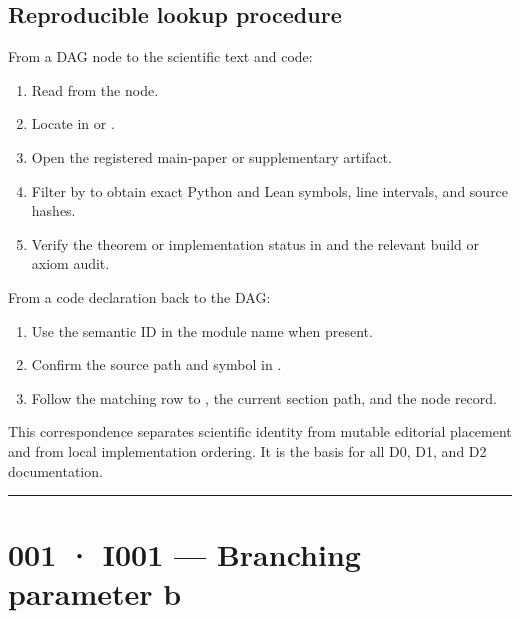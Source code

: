 \subsection{Reproducible lookup
procedure}\label{reproducible-lookup-procedure}

From a DAG node to the scientific text and code:

\begin{enumerate}
\def\labelenumi{\arabic{enumi}.}
\tightlist
\item
  Read \texttt{\protect{}} from the node.
\item
  Locate \texttt{\protect{}} in \texttt{\protect{}} or
  \texttt{\protect{}}.
\item
  Open the registered main-paper or supplementary artifact.
\item
  Filter \texttt{\protect{}} by \texttt{\protect{}} to obtain exact
  Python and Lean symbols, line intervals, and source hashes.
\item
  Verify the theorem or implementation status in
  \texttt{\protect{}}
  and the relevant build or axiom audit.
\end{enumerate}

From a code declaration back to the DAG:

\begin{enumerate}
\def\labelenumi{\arabic{enumi}.}
\tightlist
\item
  Use the semantic ID in the module name when present.
\item
  Confirm the source path and symbol in \texttt{\protect{}}.
\item
  Follow the matching row to \texttt{\protect{}}, the current section
  path, and the node record.
\end{enumerate}

This correspondence separates scientific identity from mutable editorial
placement and from local implementation ordering. It is the basis for
all D0, D1, and D2 documentation.

\begin{center}\rule{0.5\linewidth}{0.5pt}\end{center}

\section{001 · I001 --- Branching parameter
b}\label{i001-branching-parameter-b}

